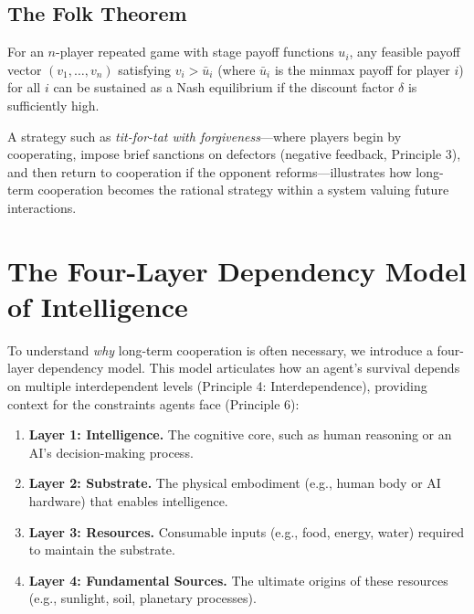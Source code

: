 \subsection{The Folk Theorem}
\begin{theorem}
For an \( n \)-player repeated game with stage payoff functions \( u_i \), any feasible payoff vector \( (v_1, \dots, v_n) \) satisfying \( v_i > \bar{u}_i \) (where \(\bar{u}_i\) is the minmax payoff for player \( i \)) for all \( i \) can be sustained as a Nash equilibrium if the discount factor \( \delta \) is sufficiently high.
\end{theorem}
A strategy such as \emph{tit-for-tat with forgiveness}---where players begin by cooperating, impose brief sanctions on defectors (negative feedback, Principle 3), and then return to cooperation if the opponent reforms---illustrates how long-term cooperation becomes the rational strategy within a system valuing future interactions.

\section{The Four-Layer Dependency Model of Intelligence}
To understand \emph{why} long-term cooperation is often necessary, we introduce a four-layer dependency model. This model articulates how an agent's survival depends on multiple interdependent levels (Principle 4: Interdependence), providing context for the constraints agents face (Principle 6):
\begin{enumerate}
    \item \textbf{Layer 1: Intelligence.}   
    The cognitive core, such as human reasoning or an AI's decision-making process.
    \item \textbf{Layer 2: Substrate.}   
    The physical embodiment (e.g., human body or AI hardware) that enables intelligence.
    \item \textbf{Layer 3: Resources.}   
    Consumable inputs (e.g., food, energy, water) required to maintain the substrate.
    \item \textbf{Layer 4: Fundamental Sources.}   
    The ultimate origins of these resources (e.g., sunlight, soil, planetary processes).
\end{enumerate}

